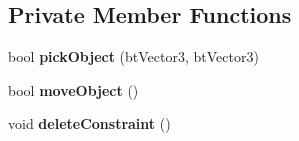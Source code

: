 \subsection*{Private Member Functions}
\begin{DoxyCompactItemize}
\item 
bool {\bfseries pick\+Object} (bt\+Vector3, bt\+Vector3)\hypertarget{class_game_1_1_player_a5c935bd7768a0cac0a7f4ca57c3fa611}{}\label{class_game_1_1_player_a5c935bd7768a0cac0a7f4ca57c3fa611}

\item 
bool {\bfseries move\+Object} ()\hypertarget{class_game_1_1_player_a75dc200d7c3cd1d66dc3eee7f7893e21}{}\label{class_game_1_1_player_a75dc200d7c3cd1d66dc3eee7f7893e21}

\item 
void {\bfseries delete\+Constraint} ()\hypertarget{class_game_1_1_player_a7b4bf21a3cd1c9a51d105f962af1c41d}{}\label{class_game_1_1_player_a7b4bf21a3cd1c9a51d105f962af1c41d}

\end{DoxyCompactItemize}

